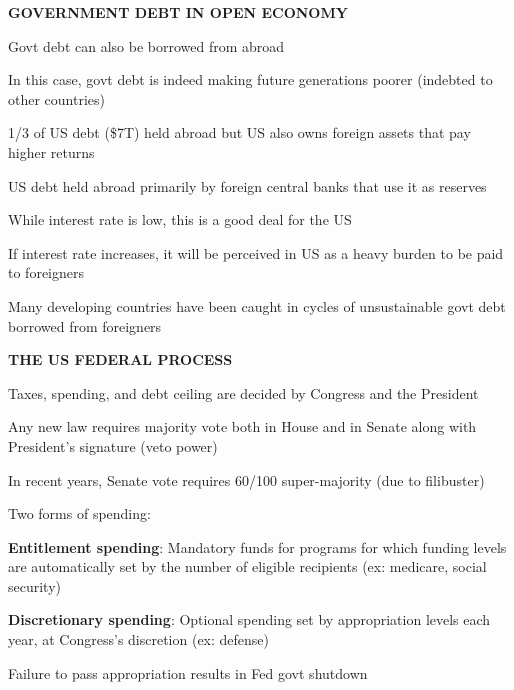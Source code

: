 \documentclass[landscape]{slides}
\begin{document}
\begin{slide}
\begin{center}
{\bf GOVERNMENT DEBT IN OPEN ECONOMY}
\end{center}

Govt debt can also be borrowed from abroad

In this case, govt debt is indeed making future generations poorer (indebted to other countries)

1/3 of US debt (\$7T) held abroad but US also owns foreign assets that pay higher returns

US debt held abroad primarily by foreign central banks that use it as reserves

While interest rate is low, this is a good deal for the US

If interest rate increases, it will be perceived in US as a heavy burden to be paid to 
foreigners 

Many developing countries have been caught in cycles of unsustainable govt debt 
borrowed from foreigners
 
\end{slide}



\begin{slide}
\begin{center}
{\bf THE US FEDERAL PROCESS}
\end{center}

Taxes, spending, and debt ceiling are decided by Congress and the President

Any new law requires majority vote both in House and in Senate along with
President's signature (veto power)

In recent years, Senate vote requires 60/100 super-majority (due to filibuster)

Two forms of spending:

{\bf Entitlement spending}:
Mandatory funds for programs for which funding levels are automatically set by the number of eligible recipients (ex: medicare, social security)

{\bf Discretionary spending}:
Optional spending set by  appropriation levels each year, at Congress's discretion (ex: defense)

\vspace{-10pt}

Failure to pass appropriation results in Fed govt shutdown

\end{slide}

%
\end{document}
